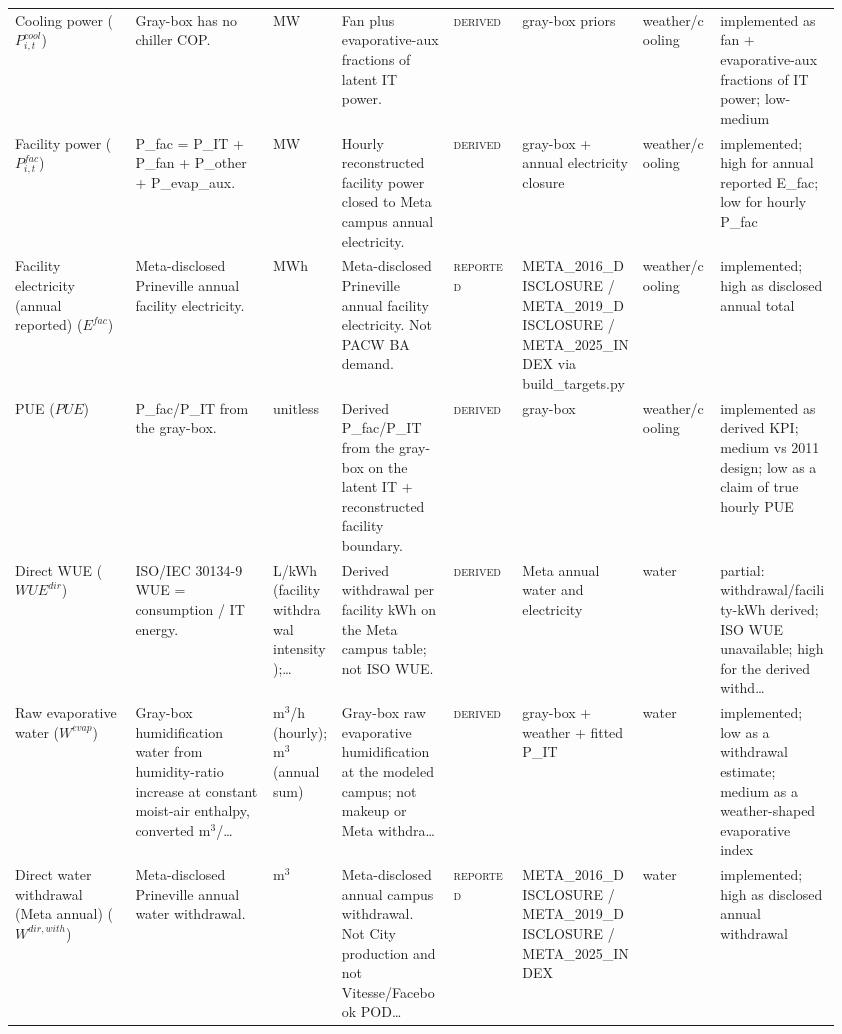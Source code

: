 \documentclass[11pt]{article}
\newcommand{\Reported}{\textsc{reported}}
\newcommand{\Derived}{\textsc{derived}}
\begin{document}
\begin{longtable}{@{}p{0.14\linewidth}p{0.16\linewidth}p{0.08\linewidth}p{0.13\linewidth}p{0.08\linewidth}p{0.14\linewidth}p{0.09\linewidth}p{0.14\linewidth}@{}}
Cooling power ($P^{cool}_{i,t}$) & Gray-box has no chiller COP. & MW & Fan plus evaporative-aux fractions of latent IT power. & \Derived{} & gray-box priors & weather/cooling & implemented as fan + evaporative-aux fractions of IT power; low-medium\\
Facility power ($P^{fac}_{i,t}$) & P\_fac = P\_IT + P\_fan + P\_other + P\_evap\_aux. & MW & Hourly reconstructed facility power closed to Meta campus annual electricity. & \Derived{} & gray-box + annual electricity closure & weather/cooling & implemented; high for annual reported E\_fac; low for hourly P\_fac\\
Facility electricity (annual reported) ($E^{fac}$) & Meta-disclosed Prineville annual facility electricity. & MWh & Meta-disclosed Prineville annual facility electricity. Not PACW BA demand. & \Reported{} & META\_2016\_DISCLOSURE / META\_2019\_DISCLOSURE / META\_2025\_INDEX via build\_targets.py & weather/cooling & implemented; high as disclosed annual total\\
PUE ($PUE$) & P\_fac/P\_IT from the gray-box. & unitless & Derived P\_fac/P\_IT from the gray-box on the latent IT + reconstructed facility boundary. & \Derived{} & gray-box & weather/cooling & implemented as derived KPI; medium vs 2011 design; low as a claim of true hourly PUE\\
Direct WUE ($WUE^{dir}$) & ISO/IEC 30134-9 WUE = consumption / IT energy. & L/kWh (facility withdrawal intensity);\ldots & Derived withdrawal per facility kWh on the Meta campus table; not ISO WUE. & \Derived{} & Meta annual water and electricity & water & partial: withdrawal/facility-kWh derived; ISO WUE unavailable; high for the derived withd\ldots\\
Raw evaporative water ($W^{evap}$) & Gray-box humidification water from humidity-ratio increase at constant moist-air enthalpy, converted m$^{3}$/\ldots & m$^{3}$/h (hourly); m$^{3}$ (annual sum) & Gray-box raw evaporative humidification at the modeled campus; not makeup or Meta withdra\ldots & \Derived{} & gray-box + weather + fitted P\_IT & water & implemented; low as a withdrawal estimate; medium as a weather-shaped evaporative index\\
Direct water withdrawal (Meta annual) ($W^{dir,with}$) & Meta-disclosed Prineville annual water withdrawal. & m$^{3}$ & Meta-disclosed annual campus withdrawal. Not City production and not Vitesse/Facebook POD\ldots & \Reported{} & META\_2016\_DISCLOSURE / META\_2019\_DISCLOSURE / META\_2025\_INDEX & water & implemented; high as disclosed annual withdrawal\\

\end{longtable}
\end{document}
